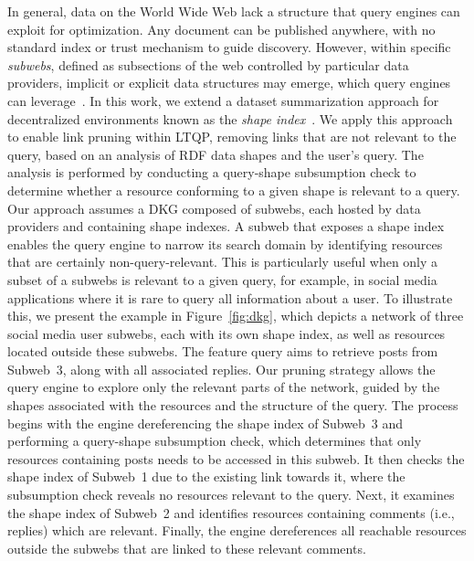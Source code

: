 In general, data on the World Wide Web lack a structure that query engines can exploit for optimization.  
Any document can be published anywhere, with no standard index or trust mechanism to guide discovery.  
However, within specific \emph{subwebs}, defined as subsections of the web controlled by particular data providers, implicit or explicit data structures may emerge, which query engines can leverage~\cite{Bogaerts2021LinkTW}.
In this work, we extend a dataset summarization approach for decentralized environments known as the \emph{shape index}~\cite{tam2024opportunitiesshapebasedoptimizationlink}.
We apply this approach to enable link pruning within LTQP, removing links that are not relevant to the query, based on an analysis of RDF data shapes and the user's query.
The analysis is performed by conducting a query-shape subsumption check to determine whether a resource conforming to a given shape is relevant to a query.
Our approach assumes a DKG composed of subwebs, each hosted by data providers and containing shape indexes.
A subweb that exposes a shape index enables the query engine to narrow its search domain by identifying resources that are certainly non-query-relevant.
This is particularly useful when only a subset of a subwebs is relevant to a given query, for example, in social media applications where it is rare to query all information about a user.
To illustrate this, we present the example in Figure~\ref{fig:dkg}, which depicts a network of three social media user subwebs, each with its own shape index, as well as resources located outside these subwebs.
The feature query aims to retrieve posts from Subweb~3, along with all associated replies.
Our pruning strategy allows the query engine to explore only the relevant parts of the network, guided by the shapes associated with the resources and the structure of the query.
The process begins with the engine dereferencing the shape index of Subweb~3 and performing a query-shape subsumption check, which determines that only resources containing posts needs to be accessed in this subweb.  
It then checks the shape index of Subweb~1 due to the existing link towards it, where the subsumption check reveals no resources relevant to the query.  
Next, it examines the shape index of Subweb~2 and identifies resources containing comments (i.e., replies) which are relevant.  
Finally, the engine dereferences all reachable resources outside the subwebs that are linked to these relevant comments.

